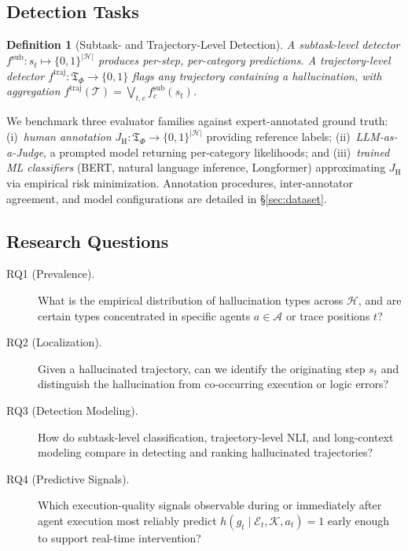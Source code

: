 \documentclass{article}
\newtheorem{definition}{Definition}
\begin{document}
\subsection{Detection Tasks}
\label{sec:detection_tasks}

\begin{definition}[Subtask- and Trajectory-Level Detection]
A \emph{subtask-level detector} $f^{\text{sub}} : s_t \mapsto \{0,1\}^{|\mathcal{H}|}$ produces per-step, per-category predictions. A \emph{trajectory-level detector} $f^{\text{traj}} : \mathfrak{T}_\Phi \to \{0,1\}$ flags any trajectory containing a hallucination, with aggregation $f^{\text{traj}}(\mathcal{T}) = \bigvee_{t,c} f^{\text{sub}}_c(s_t)$.
\end{definition}

We benchmark three evaluator families against expert-annotated ground truth: (i)~\emph{human annotation} $J_{\text{H}} : \mathfrak{T}_\Phi \to \{0,1\}^{|\mathcal{H}|}$ providing reference labels; (ii)~\emph{LLM-as-a-Judge}, a prompted model returning per-category likelihoods; and (iii)~\emph{trained ML classifiers} (BERT, natural language inference, Longformer) approximating $J_{\text{H}}$ via empirical risk minimization. Annotation procedures, inter-annotator agreement, and model configurations are detailed in \S\ref{sec:dataset}.

\subsection{Research Questions}
\label{sec:rqs}

\begin{description}
    \item[RQ1 (Prevalence).] What is the empirical distribution of hallucination types across $\mathcal{H}$, and are certain types concentrated in specific agents $a \in \mathcal{A}$ or trace positions $t$?
    \item[RQ2 (Localization).] Given a hallucinated trajectory, can we identify the originating step $s_t$ and distinguish the hallucination from co-occurring execution or logic errors?
    \item[RQ3 (Detection Modeling).] How do subtask-level classification, trajectory-level NLI, and long-context modeling compare in detecting and ranking hallucinated trajectories?
    \item[RQ4 (Predictive Signals).] Which execution-quality signals observable during or immediately after agent execution most reliably predict $h(g_t \mid \mathcal{E}_t, \mathcal{K}, a_t) = 1$ early enough to support real-time intervention?
\end{description}
\end{document}

